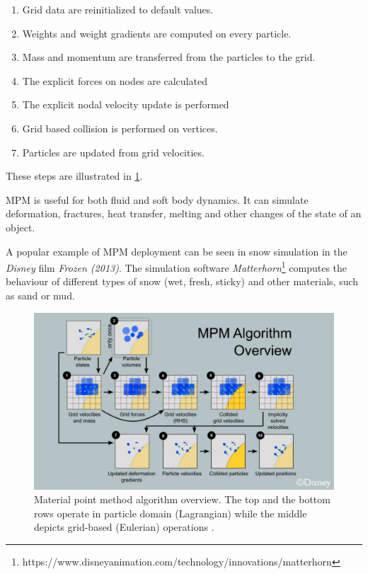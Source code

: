 \begin{enumerate}
    \item Grid data are reinitialized to default values.
    \item Weights and weight gradients are computed on every particle.
    \item Mass and momentum are transferred from the particles to the grid.
    \item The explicit forces on nodes are calculated
    \item The explicit nodal velocity update is performed
    \item Grid based collision is performed on vertices.
    \item Particles are updated from grid velocities.
\end{enumerate}
These steps are illustrated in \cref{fig:mpm}.

MPM is useful for both fluid and soft body dynamics. It can simulate deformation, fractures, heat transfer, melting and other changes of the state of an object.

A popular example of MPM deployment can be seen in snow simulation in the \emph{Disney} film \emph{Frozen (2013)}. The simulation software \emph{Matterhorn}\footnote{https://www.disneyanimation.com/technology/innovations/matterhorn} computes the behaviour of different types of snow (\eg wet, fresh, sticky) and other materials, such as sand or mud.

\begin{figure}
\centering
\includegraphics[width=\textwidth]{img/MPM}
\caption{Material point method algorithm overview. The top and the bottom rows operate in particle domain (Lagrangian) while the middle depicts grid-based (Eulerian) operations \cite{disney}.
}
\label{fig:mpm}
\end{figure}

